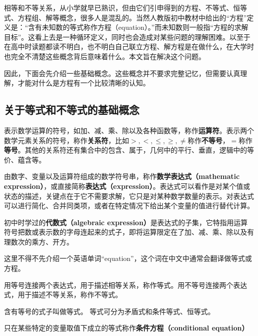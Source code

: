 
\begin{issues}
\issueDraft
\end{issues}

相等和不等关系，从小学就早已熟识，但由它们引申得到的方程、不等式、恒等式、方程组、解等概念，很多人是混乱的。当然人教版初中教材中给出的“方程”定义是：“含有未知数的等式称作方程（equation）。”而未知数则一般指“方程的求解目标”。这看上去是一种循环定义，同时也会造成对某些问题的理解困难。以至于在高中时读题都读不明白，也不明白自己联立方程、解方程是在做什么，在大学时也完全不清楚这些概念背后意味着什么。本文旨在解决这个问题。

因此，下面会先介绍一些基础概念。这些概念并不要求完整记忆，但需要认真理解，才能对什么是方程有一个比较清晰的认知。

\subsection{关于等式和不等式的基础概念}



表示数学运算的符号，如加、减、乘、除以及各种函数等，称作\textbf{运算符}。表示两个数学元素关系的符号，称作\textbf{关系符}，比如$>,<,\leq,\geq,\neq$称作\textbf{不等号}，$=$称作\textbf{等号}。其他的关系符还有集合中的包含、属于，几何中的平行、垂直，逻辑中的等价、蕴含等。

由数字、变量以及运算符组成的数学符号串，称作\textbf{数学表达式（mathematic expression）}，或直接简称\textbf{表达式（expression）}。表达式可以看作是对某个值或状态的描述，关键点在于它不需要求解，它只是对某种数学数量的表示。对表达式可以进行简化、合并同类项，或者在特定情况下给出某个变量的值进行替代计算。

初中时学过的\textbf{代数式（algebraic expression）}是表达式的子集，它特指用运算符号把数或表示数的字母连起来的式子，即将运算限定在了加、减、乘、除以及有理数次的乘方、开方。

这里不得不先介绍一个英语单词“equation”，这个词在中文中通常会翻译做等式或方程。

用等号连接两个表达式，用于描述相等关系，称作等式。用不等号连接两个表达式，用于描述不等关系，称作不等式。%

含有等号的式子叫做等式。 等式可分为矛盾式和条件等式、恒等式。

只在某些特定的变量取值下成立的等式称作\textbf{条件方程（conditional equation）}




